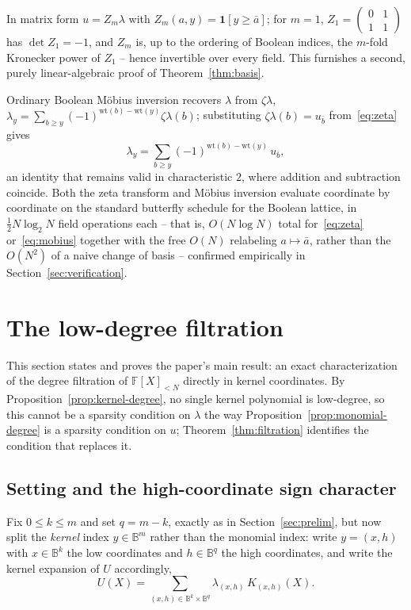 \documentclass[preprint,3p,12pt,numbers]{elsarticle}
\theoremstyle{definition}
\theoremstyle{remark}
\newcommand{\wt}{\mathrm{wt}}
\begin{document}
In matrix form $u = Z_m \lambda$ with
$Z_m(a,y) = \mathbf{1}[y \geq \bar a]$; for $m=1$,
$Z_1 = \left(\begin{smallmatrix} 0 & 1 \\ 1 & 1 \end{smallmatrix}\right)$
has $\det Z_1 = -1$, and $Z_m$ is, up to the ordering of Boolean indices,
the $m$-fold Kronecker power of $Z_1$ -- hence invertible over every field.
This furnishes a second, purely linear-algebraic proof of
Theorem~\ref{thm:basis}.

Ordinary Boolean M\"obius inversion recovers $\lambda$ from $\zeta\lambda$,
$\lambda_y = \sum_{b \geq y} (-1)^{\wt(b)-\wt(y)} \zeta\lambda(b)$;
substituting $\zeta\lambda(b) = u_{\bar b}$ from~\eqref{eq:zeta} gives
\begin{equation}
\label{eq:mobius}
  \lambda_y = \sum_{b \geq y} (-1)^{\wt(b)-\wt(y)}\, u_{\bar b} ,
\end{equation}
an identity that remains valid in characteristic $2$, where addition and
subtraction coincide. Both the zeta transform and M\"obius inversion
evaluate coordinate by coordinate on the standard butterfly schedule for
the Boolean lattice, in $\tfrac{1}{2} N \log_2 N$ field operations each --
that is, $O(N \log N)$ total for~\eqref{eq:zeta} or~\eqref{eq:mobius}
together with the free $O(N)$ relabeling $a \mapsto \bar a$, rather than
the $O(N^2)$ of a naive change of basis -- confirmed empirically in
Section~\ref{sec:verification}.

\section{The low-degree filtration}
\label{sec:filtration}

This section states and proves the paper's main result: an exact
characterization of the degree filtration of $\mathbb{F}[X]_{<N}$ directly
in kernel coordinates. By Proposition~\ref{prop:kernel-degree}, no single
kernel polynomial is low-degree, so this cannot be a sparsity condition on
$\lambda$ the way Proposition~\ref{prop:monomial-degree} is a sparsity
condition on $u$; Theorem~\ref{thm:filtration} identifies the condition
that replaces it.

\subsection{Setting and the high-coordinate sign character}
\label{subsec:filt-setting}

Fix $0 \leq k \leq m$ and set $q=m-k$, exactly as in
Section~\ref{sec:prelim}, but now split the \emph{kernel} index
$y \in \mathbb{B}^m$ rather than the monomial index: write $y=(x,h)$ with
$x \in \mathbb{B}^k$ the low coordinates and $h \in \mathbb{B}^{q}$ the
high coordinates, and write the kernel expansion of $U$ accordingly,
\[
  U(X) = \sum_{(x,h) \in \mathbb{B}^k \times \mathbb{B}^{q}}
  \lambda_{(x,h)}\, K_{(x,h)}(X) .
\]
\end{document}
